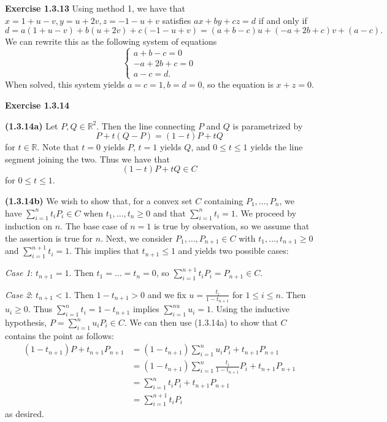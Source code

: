 \documentclass[12pt,oneside]{article}
\newenvironment{exercise}[1]{\vspace{.1in}\noindent\textbf{Exercise #1 \hspace{.05em}}}{}
\newcommand{\R}{\mathbb{R}}
\begin{document}
\begin{exercise}{1.3.13}
    Using method 1, we have that $x = 1 + u - v, y = u + 2v, z = -1 - u + v$ satisfies 
    $ax + by +cz = d$ if and only if 
    \[
        d = a(1 + u - v) + b(u + 2v) + c(-1 - u + v) = (a + b - c)u + (-a + 2b + c)v + (a - c).
    \]
    We can rewrite this as the following system of equations
    \[
        \begin{cases}
            a + b - c = 0\\
            -a + 2b + c = 0\\
            a - c = d.
        \end{cases}
    \]
    When solved, this system yields $a = c = 1, b = d = 0$, so the equation is $x + z = 0$.
\end{exercise}

\newpage
\begin{exercise}{1.3.14}

    \bigskip
    \textbf{(1.3.14a)}
    Let $P, Q \in \R^2$. Then the line connecting $P$ and $Q$ is parametrized by 
    \[
        P + t(Q - P) = (1 - t)P + tQ
    \]
    for $t \in \R$. Note that $t = 0$ yields $P$, $t = 1$ yields $Q$, and $0 \leq t \leq 1$
    yields the line segment joining the two. Thus we have that 
    \[
        (1-t)P + tQ \in C
    \]
    for $0 \leq t \leq 1$.
    
    \bigskip
    \textbf{(1.3.14b)}
    We wish to show that, for a convex set $C$ containing $P_1, \ldots, P_n$, we have 
    $\sum_{i = 1}^nt_iP_i \in C$ when $t_1, \ldots, t_n \geq 0$ and that $\sum_{i = 1}^n t_i = 1$. 
    We proceed by induction on $n$. The base case of $n = 1$ is true by observation, 
    so we assume that the assertion is true for $n$. Next, we consider 
    $P_1, \ldots, P_{n + 1} \in C$ with $t_1, \ldots, t_{n+1} \geq 0$ and 
    $\sum_{i = 1}^{n + 1} t_i = 1$. This implies that $t_{n + 1} \leq 1$ and yields two 
    possible cases:
    
    \textit{Case 1}: $t_{n+1} = 1$. Then $t_1 = \ldots = t_n = 0$, so 
    $\sum_{i = 1}^{n+1}t_iP_i = P_{n + 1} \in C$.
    
    \textit{Case 2}: $t_{n+1} < 1$. Then $1 - t_{n+1} > 0$ and we fix 
    $u = \frac{t_i}{1-t_{n+1}}$ for $1 \leq i \leq n$. Then $u_i \geq 0$. Thus 
    $\sum_{i = 1}^nt_i = 1-t_{n+1}$ implies $\sum_{i = 1}^{nu}u_i = 1$. Using the 
    inductive hypothesis, $P = \sum_{i = 1}^nu_iP_i \in C$. We can then use (1.3.14a)
    to show that $C$ contains the point as follows:
    \begin{align*}
        (1-t_{n+1})P + t_{n+1}P_{n+1}   &= (1-t_{n+1})\sum_{i = 1}^nu_iP_i + t_{n+1}P_{n+1}\\
                                        &= (1-t_{n+1})\sum_{i = 1}^n\frac{t_i}{1-t_{n+1}}P_i + t_{n+1}P_{n+1}\\
                                        &= \sum_{i = 1}^nt_iP_i + t_{n+1}P_{n+1}\\
                                        &= \sum_{i = 1}^{n+1}t_iP_i
    \end{align*}
    as desired.
\end{exercise}


\end{document}
